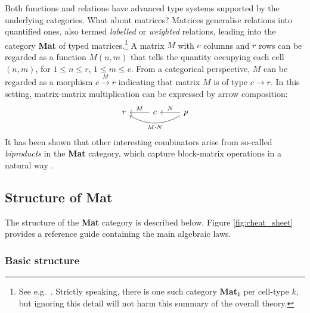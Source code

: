 \documentclass[sigplan,screen]{acmart}\settopmatter{}
\begin{document}
Both functions and relations have advanced type systems supported by the underlying categories. What about matrices? Matrices generalise relations into quantified ones, also termed \emph{labelled} or \emph{weighted} relations, leading into the category \textbf{Mat} of typed matrices.\footnote{See e.g.\ \cite{MO13c}. Strictly speaking, there is one such category \textbf{Mat}$_k$ per cell-type $k$, but ignoring this detail will not harm this summary of the overall theory.} A matrix $M$ with $c$ columns and $r$ rows can be regarded as a function $M(n, m)$ that tells the quantity occupying each cell $(n,m)$, for $1 \leq n \leq r$,  $1 \leq m \leq c$. From a categorical perspective, $M$ can be regarded as a morphism $c \xrightarrow{M} r$ indicating that matrix $M$ is of type $c \longrightarrow r$. In this setting, matrix-matrix multiplication can be expressed by arrow composition:
\begin{equation}\label{mm-cat-comp}
\begin{tikzcd}
r & c \arrow[l, "M"'] & p \arrow[l, "N"'] \arrow[ll, "M \cdot N", bend left]
\end{tikzcd}
\end{equation}
\noindent It has been shown that other interesting combinators arise from so-called \emph{biproducts} in the \textbf{Mat} category, which capture block-matrix operations in a natural way \cite{MO13c}. 

\subsection{Structure of \textbf{Mat}}\label{sec-struct-mat}
The structure of the \textbf{Mat} category is described below. \newline Figure \ref{fig:cheat_sheet} provides a reference guide containing the main algebraic laws.

\subsubsection{Basic structure}
\end{document}
